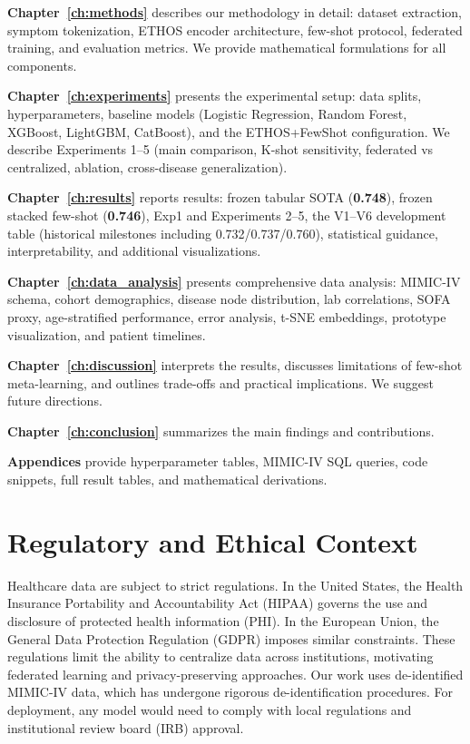 \textbf{Chapter~\ref{ch:methods}} describes our methodology in detail: dataset extraction, symptom tokenization, ETHOS encoder architecture, few-shot protocol, federated training, and evaluation metrics. We provide mathematical formulations for all components.

\textbf{Chapter~\ref{ch:experiments}} presents the experimental setup: data splits, hyperparameters, baseline models (Logistic Regression, Random Forest, XGBoost, LightGBM, CatBoost), and the ETHOS+FewShot configuration. We describe Experiments 1--5 (main comparison, K-shot sensitivity, federated vs centralized, ablation, cross-disease generalization).

\textbf{Chapter~\ref{ch:results}} reports results: frozen tabular SOTA (\textbf{0.748}), frozen stacked few-shot (\textbf{0.746}), Exp1 and Experiments 2--5, the V1--V6 development table (historical milestones including 0.732/0.737/0.760), statistical guidance, interpretability, and additional visualizations.

\textbf{Chapter~\ref{ch:data_analysis}} presents comprehensive data analysis: MIMIC-IV schema, cohort demographics, disease node distribution, lab correlations, SOFA proxy, age-stratified performance, error analysis, t-SNE embeddings, prototype visualization, and patient timelines.

\textbf{Chapter~\ref{ch:discussion}} interprets the results, discusses limitations of few-shot meta-learning, and outlines trade-offs and practical implications. We suggest future directions.

\textbf{Chapter~\ref{ch:conclusion}} summarizes the main findings and contributions.

\textbf{Appendices} provide hyperparameter tables, MIMIC-IV SQL queries, code snippets, full result tables, and mathematical derivations.

\section{Regulatory and Ethical Context}

Healthcare data are subject to strict regulations. In the United States, the Health Insurance Portability and Accountability Act (HIPAA) governs the use and disclosure of protected health information (PHI). In the European Union, the General Data Protection Regulation (GDPR) imposes similar constraints. These regulations limit the ability to centralize data across institutions, motivating federated learning and privacy-preserving approaches. Our work uses de-identified MIMIC-IV data, which has undergone rigorous de-identification procedures. For deployment, any model would need to comply with local regulations and institutional review board (IRB) approval.

